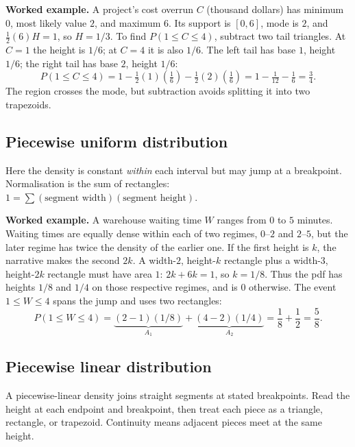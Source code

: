 \textbf{Worked example.} A project's cost overrun $C$ (thousand dollars) has
minimum $0$, most likely value $2$, and maximum $6$.  Its support is $[0,6]$,
mode is $2$, and $\tfrac12(6)H=1$, so $H=1/3$.  To find
$P(1\le C\le4)$, subtract two tail triangles.  At $C=1$ the height is $1/6$;
at $C=4$ it is also $1/6$.  The left tail has base $1$, height $1/6$; the
right tail has base $2$, height $1/6$:
\[
 P(1\le C\le4)=1-\tfrac12(1)(\tfrac16)-\tfrac12(2)(\tfrac16)
 =1-\tfrac1{12}-\tfrac16=\tfrac34.
\]
The region crosses the mode, but subtraction avoids splitting it into two
trapezoids.

\subsection{Piecewise uniform distribution}\label{sec:c2-intro-piecewise-uniform}
Here the density is constant \emph{within} each interval but may jump at a
breakpoint.  Normalisation is the sum of rectangles:
$1=\sum(\text{segment width})(\text{segment height})$.

\textbf{Worked example.} A warehouse waiting time $W$ ranges from $0$ to $5$
minutes.  Waiting times are equally dense within each of two regimes, $0$--$2$
and $2$--$5$, but the later regime has twice the density of the earlier one.
If the first height is $k$, the narrative makes the second $2k$.  A width-$2$,
height-$k$ rectangle plus a width-$3$, height-$2k$ rectangle must have area
$1$: $2k+6k=1$, so $k=1/8$.  Thus the pdf has heights $1/8$ and $1/4$ on
those respective regimes, and is $0$ otherwise.
The event $1\le W\le4$ spans the jump and uses two rectangles:
\[
 P(1\le W\le4)=\underbrace{(2-1)(1/8)}_{A_1}
 +\underbrace{(4-2)(1/4)}_{A_2}=\frac18+\frac12=\frac58.
\]

\subsection{Piecewise linear distribution}\label{sec:c2-intro-piecewise-linear}
A piecewise-linear density joins straight segments at stated breakpoints.
Read the height at each endpoint and breakpoint, then treat each piece as a
triangle, rectangle, or trapezoid.  Continuity means adjacent pieces meet at
the same height.

